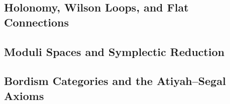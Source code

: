 
\subsection{Holonomy, Wilson Loops, and Flat Connections}
\label{subsec:holonomy-flat}


\subsection{Moduli Spaces and Symplectic Reduction}
\label{subsec:moduli-symplectic}


\subsection{Bordism Categories and the Atiyah--Segal Axioms}
\label{subsec:bordism-atiyah-segal}

